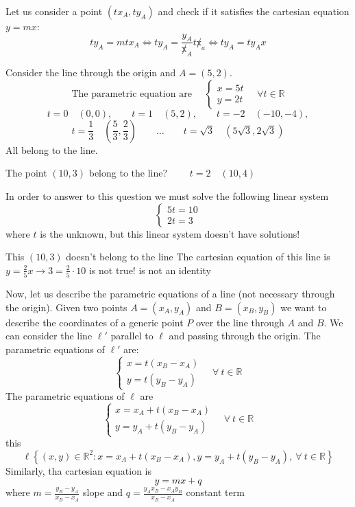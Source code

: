 Let us consider a point $(tx_A, ty_A)$ and check if it satisfies the cartesian equation $y=mx$:
$$ty_A = mtx_A \Leftrightarrow ty_A = \frac{y_A}{\not x_A}t \not x_a \Leftrightarrow ty_A = ty_Ax$$
\begin{example}
    Consider the line through the origin and $A = (5,2)$.
    $$\text{The parametric equation are } \quad \begin{cases}
        x= 5t\\
        y= 2t
    \end{cases} \quad \forall t \in \mathbb{R} $$
    $$t = 0 \quad (0,0), \qquad t= 1 \quad (5,2), \qquad t=-2 \quad \left(-10,-4\right),  $$ 
    $$t= \frac{1}{3} \quad \left(\frac{5}{3}, \frac{2}{3}\right) \qquad \dots \qquad t=\sqrt{3} \quad \left(5\sqrt{3},2\sqrt{3}\right)$$
    All belong to the line. 
    
    The point $(10,3)$ belong to the line? $ \qquad t=2 \quad (10,4)$

    In order to answer to this question we must solve the following linear system
    $$\begin{cases}
        5t = 10\\
        2t = 3
    \end{cases}$$
    where $t$ is the unknown, but this linear system doesn't have solutions!

    This $(10,3)$ doesn't belong to the line
    The cartesian equation of this line is $y = \frac{2}{5}x \to 3=\frac{2}{5}\cdot10$ is not true! is not an identity
\end{example}
Now, let us describe the parametric equations of a line (not necessary through the origin). Given two points $A=(x_A, y_A)$ and $B = (x_B, y_B)$ we want to describe the coordinates of a generic point $P$ over the line through $A$ and $B$. We can consider the line $\ell'$ parallel to $\ell$ and passing through the origin. The parametric equations of $\ell'$ are:
$$\begin{cases}
    x = t(x_B-x_A)\\
    y = t(y_B-y_A)
\end{cases} \quad \forall \ t \in \mathbb{R}$$
The parametric equations of $\ell$ are
$$\begin{cases}
    x = x_A + t(x_B - x_A)\\
    y = y_A + t(y_B - y_A)
\end{cases} \quad \forall \ t \in \mathbb{R}$$
this 
$$\ell \left\{ (x,y) \in \mathbb{R}^2 : x = x_A + t (x_B-x_A), y = y_A + t(y_B-y_A),  \ \forall \ t \in \mathbb{R} \right\}$$
Similarly, tha cartesian equation is
$$y = mx + q$$
where $m = \frac{y_B - y_A}{x_B - x_A}$ slope and $q = \frac{y_A x_B - x_Ay_B}{x_B-x_A}$ constant term

